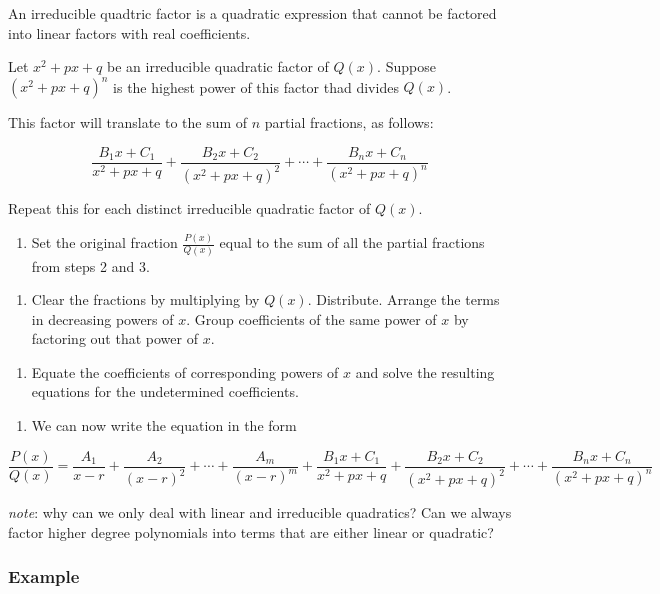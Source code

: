 \documentclass{article}
\begin{document}
An irreducible quadtric factor is a quadratic expression that cannot be factored into linear factors with real coefficients.

Let $x^2 + px + q$ be an irreducible quadratic factor of $Q(x)$. Suppose $(x^2 +px + q)^n$ is the highest power of this factor thad divides $Q(x)$.

This factor will translate to the sum of $n$ partial fractions, as follows:

\[ \frac{B_1 x + C_1}{x^2+px+q} + \frac{B_2 x + C_2}{(x^2+px+q)^2} + \cdots + \frac{B_n x + C_n}{(x^2+px+q)^n} \]

Repeat this for each distinct irreducible quadratic factor of $Q(x)$.

\begin{enumerate}
\item Set the original fraction $\frac{P(x)}{Q(x)}$ equal to the sum of all the partial fractions from steps 2 and 3.
\end{enumerate}

\begin{enumerate}
\item Clear the fractions by multiplying by $Q(x)$. Distribute. Arrange the terms in decreasing powers of $x$. Group coefficients of the same power of $x$ by factoring out that power of $x$.
\end{enumerate}

\begin{enumerate}
\item Equate the coefficients of corresponding powers of $x$ and solve the resulting equations for the undetermined coefficients.
\end{enumerate}

\begin{enumerate}
\item We can now write the equation in the form
\end{enumerate}

\[ \frac{P(x)}{Q(x)} = \frac{A_1}{x-r} + \frac{A_2}{(x-r)^2} + \cdots + \frac{A_m}{(x - r)^m} + \frac{B_1 x + C_1}{x^2+px+q} + \frac{B_2 x + C_2}{(x^2+px+q)^2} + \cdots + \frac{B_n x + C_n}{(x^2+px+q)^n} \]

\emph{note}: why can we only deal with linear and irreducible quadratics? Can we always factor higher degree polynomials into terms that are either linear or quadratic?

\subsubsection{Example}
\end{document}
